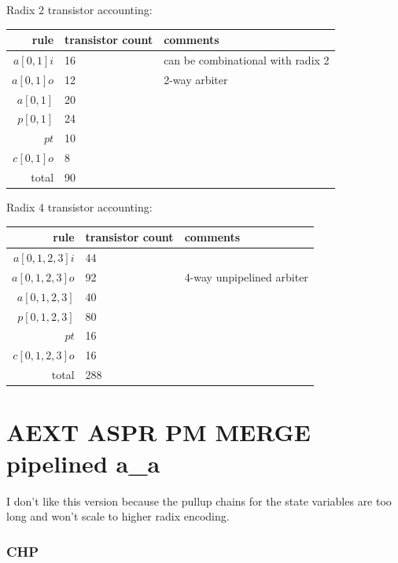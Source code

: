 \documentclass{article}
\begin{document}
\noindent
Radix 2 transistor accounting:

\begin{center}
    \begin{tabular}{|r|l|l|}
    \hline
    rule & transistor count & comments \\ \hline
    $a[0,1]i$ & 16 & can be combinational with radix 2 \\ \hline
    $a[0,1]o$ & 12 & 2-way arbiter \\ \hline
    $a[0,1]$ & 20 & \\ \hline
    $p[0,1]$ & 24 & \\ \hline
    $pt$ & 10 & \\ \hline
    $c[0,1]o$ & 8 & \\ \hline
    \hline total & 90 & \\ \hline
    \end{tabular}
\end{center}

\noindent
Radix 4 transistor accounting:

\begin{center}
    \begin{tabular}{|r|l|l|}
    \hline
    rule & transistor count & comments \\ \hline
    $a[0,1,2,3]i$ & 44 & \\ \hline
    $a[0,1,2,3]o$ & 92 & 4-way unpipelined arbiter \\ \hline
    $a[0,1,2,3]$ & 40 & \\ \hline
    $p[0,1,2,3]$ & 80 & \\ \hline
    $pt$ & 16 & \\ \hline
    $c[0,1,2,3]o$ & 16 & \\ \hline
    \hline total & 288 & \\ \hline
    \end{tabular}
\end{center}

\section{AEXT ASPR PM MERGE pipelined a\_a \label{sec:AEXT_ASPR_PM_MERGE_p_a_a}}

I don't like this version because the pullup chains for the state variables
are too long and won't scale to higher radix encoding.

\subsubsection*{CHP}
\end{document}
